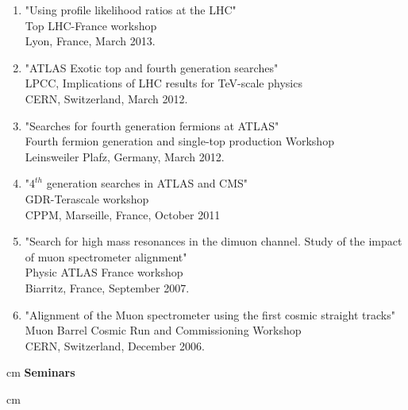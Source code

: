 \documentclass[12pt]{article}
\begin{document}
\begin{enumerate}
\item "Using profile likelihood ratios at the LHC"\\
Top LHC-France workshop \\
Lyon, France, March 2013.

\item "ATLAS Exotic top and fourth generation searches"\\
LPCC, Implications of LHC results for TeV-scale physics\\
CERN, Switzerland, March 2012.

\item "Searches for fourth generation fermions at ATLAS"\\
Fourth fermion generation and single-top production Workshop\\
Leinsweiler Plafz, Germany, March 2012.

\item "$4^{th}$ generation searches in ATLAS and CMS"\\
GDR-Terascale workshop\\
CPPM, Marseille, France, October 2011


\item "Search for high mass resonances in the dimuon channel. Study of the impact of muon spectrometer alignment"\\
Physic ATLAS France workshop\\
 Biarritz, France, September 2007.	

\item "Alignment of the Muon spectrometer using the first cosmic straight tracks"\\
Muon Barrel Cosmic Run and Commissioning Workshop\\
CERN, Switzerland, December 2006.


\end{enumerate}




 cm
{\bf Seminars}

 cm
\end{document}
